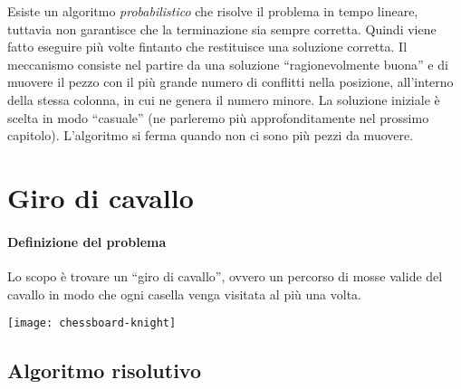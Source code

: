 Esiste un algoritmo \emph{probabilistico} che risolve il problema in tempo lineare, tuttavia non garantisce che la terminazione sia sempre corretta.
Quindi viene fatto eseguire più volte fintanto che restituisce una soluzione corretta.
Il meccanismo consiste nel partire da una soluzione \enquote{ragionevolmente buona} e di muovere il pezzo con il più grande numero di conflitti nella posizione, all'interno della stessa colonna, in cui ne genera il numero minore.
La soluzione iniziale è scelta in modo \enquote{casuale} (ne parleremo più approfonditamente nel prossimo capitolo).
L'algoritmo si ferma quando non ci sono più pezzi da muovere.

\newpage
\section{Giro di cavallo}

\begin{minipage}{.675\textwidth}
\paragraph{Definizione del problema}
Lo scopo è trovare un \enquote{giro di cavallo}, ovvero un percorso di mosse valide del cavallo in modo che ogni casella venga visitata al più una volta.
\end{minipage}
\begin{minipage}{.3\textwidth}
	\centering
	\texttt{[image: chessboard-knight]}
\end{minipage}

\subsection{Algoritmo risolutivo}

